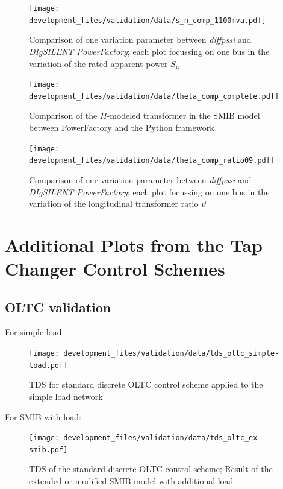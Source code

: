 \begin{figure}[H]
    \centering
    \texttt{[image: development\_files/validation/data/s\_n\_comp\_1100mva.pdf]}
    \caption{Comparison of one variation parameter between \textit{diffpssi} and \textit{DIgSILENT PowerFactory}; each plot focussing on one bus in the variation of the rated apparent power $S_\mathrm{n}$}
    \label{fig:valid-s-1100}
\end{figure}

\begin{figure}[H]
    \centering
    \texttt{[image: development\_files/validation/data/theta\_comp\_complete.pdf]}
    \caption{Comparison of the $\Pi$-modeled transformer in the \acs{SMIB} model between PowerFactory and the Python framework}
    \label{fig:valid-ratio-comp}
\end{figure}

\begin{figure}[H]
    \centering
    \texttt{[image: development\_files/validation/data/theta\_comp\_ratio09.pdf]}
    \caption{Comparison of one variation parameter between \textit{diffpssi} and \textit{DIgSILENT PowerFactory}; each plot focussing on one bus in the variation of the longitudinal transformer ratio $\vartheta$}
    \label{fig:valid-ratio-09}
\end{figure}

\section{Additional Plots from the Tap Changer Control Schemes}
\label{app:add-validation-tap-changer}

\subsection{OLTC validation}

For simple load:
\begin{figure}[H]
    \centering
    \texttt{[image: development\_files/validation/data/tds\_oltc\_simple-load.pdf]}
    \caption{\acf{TDS} for standard discrete \acs{OLTC} control scheme applied to the simple load network}
    \label{fig:valid-ratio-09}
\end{figure}

For SMIB with load:
\begin{figure}[H]
    \centering
    \texttt{[image: development\_files/validation/data/tds\_oltc\_ex-smib.pdf]}
    \caption[Time Domain Result of the OLTC control scheme applied on the extended \acs{SMIB} network]{\acf{TDS} of the standard discrete \acs{OLTC} control scheme; Result of the extended or modified \acs{SMIB} model with additional load}
    \label{fig:tds-oltc-ex-smib}
\end{figure}

